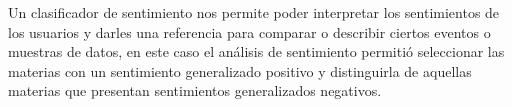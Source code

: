\documentclass[a4paper,12pt]{article}
\begin{document}
Un clasificador de sentimiento nos permite poder interpretar los sentimientos de los usuarios y darles una referencia para comparar o describir ciertos eventos o muestras de datos, en este caso el análisis de sentimiento permitió seleccionar las materias con un sentimiento generalizado positivo y distinguirla de aquellas materias que presentan sentimientos generalizados negativos.





\end{document}
